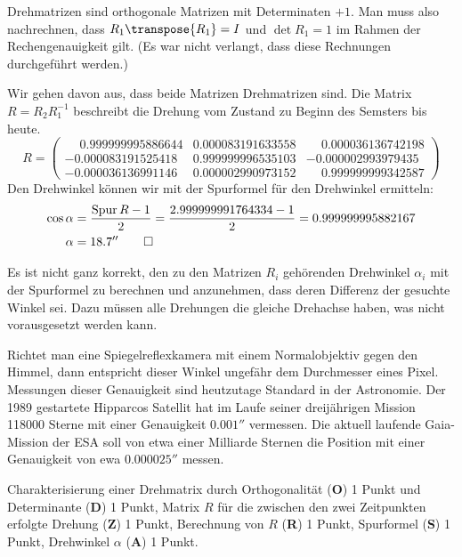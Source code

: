 \begin{loesung}
\begin{teilaufgaben}
\item
Drehmatrizen sind orthogonale Matrizen mit Determinaten $+1$.
Man muss also nachrechnen, dass $R_1\transpose{R_1}=I$ und $\det R_1=1$
im Rahmen der Rechengenauigkeit gilt. (Es war nicht verlangt,
dass diese Rechnungen durchgeführt werden.)
\item
Wir gehen davon aus, dass beide Matrizen Drehmatrizen sind.
Die Matrix $R=R_2R_1^{-1}$ beschreibt die Drehung vom Zustand zu Beginn
des Semsters bis heute.
\[
R = \begin{pmatrix}
\phantom{-}0.999999995886644& 0.000083191633558&\phantom{-}0.000036136742198\\
          -0.000083191525418& 0.999999996535103&          -0.000002993979435\\
          -0.000036136991146& 0.000002990973152&\phantom{-}0.999999999342587
\end{pmatrix}
\]
Den Drehwinkel können wir mit der Spurformel für den Drehwinkel ermitteln:
\begin{align*}
\cos\alpha
&=
\frac{\operatorname{Spur}R-1}2=\frac{2.999999991764334-1}2
=
0.999999995882167
\\
\alpha&=18.7''
\qedhere
\end{align*}
\end{teilaufgaben}
\end{loesung}

\begin{diskussion}
Es ist nicht ganz korrekt, den zu den Matrizen $R_i$ gehörenden Drehwinkel
$\alpha_i$ mit der Spurformel zu berechnen und anzunehmen, dass deren
Differenz der gesuchte Winkel sei.
Dazu müssen alle Drehungen die gleiche Drehachse haben, was nicht
vorausgesetzt werden kann.

Richtet man eine Spiegelreflexkamera mit einem Normalobjektiv gegen den
Himmel, dann entspricht dieser Winkel ungefähr dem Durchmesser eines Pixel.
Messungen dieser Genauigkeit sind heutzutage Standard in der Astronomie.
Der 1989 gestartete Hipparcos Satellit hat im Laufe seiner dreijährigen
Mission 118000 Sterne mit einer Genauigkeit $0.001''$ vermessen.
Die aktuell laufende Gaia-Mission der ESA soll von etwa einer Milliarde
Sternen die Position mit einer Genauigkeit von ewa $0.000025''$ messen.
\end{diskussion}

\begin{bewertung}
Charakterisierung einer Drehmatrix durch Orthogonalität ({\bf O}) 1 Punkt
und Determinante ({\bf D}) 1 Punkt,
Matrix $R$ für die zwischen den zwei Zeitpunkten erfolgte Drehung ({\bf Z})
1 Punkt,
Berechnung von $R$ ({\bf R}) 1 Punkt,
Spurformel ({\bf S}) 1 Punkt,
Drehwinkel $\alpha$ ({\bf A}) 1 Punkt.
\end{bewertung}

